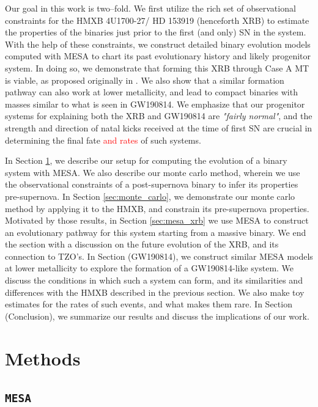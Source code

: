 \documentclass[linenumbers,trackchanges,twocolumn]{aastex701}
\newcommand{\red}{\textcolor{red}}
\begin{document}
Our goal in this work is two--fold. We first utilize the rich set of observational constraints for the HMXB 4U1700-27/ HD 153919 (henceforth XRB) to estimate the properties of the binaries just prior to the first (and only) SN in the system. With the help of these constraints, we construct detailed binary evolution models computed with MESA to chart its past evolutionary history and likely progenitor system. In doing so, we demonstrate that forming this XRB through Case A MT is viable, as proposed originally in \citep{2021A&A...655A..31V}. We also show that a similar formation pathway can also work at lower metallicity, and lead to compact binaries with masses similar to what is seen in GW190814. We emphasize that our progenitor systems for explaining both the XRB and GW190814 are \textit{"fairly normal"}, and the strength and direction of natal kicks received at the time of first SN are crucial in determining the final fate \red{and rates} of such systems.

In Section \ref{sec:methods}, we describe our setup for computing the evolution of a binary system with MESA. We also describe our monte carlo method, wherein we use the observational constraints of a post-supernova binary to infer its properties pre-supernova. In Section \ref{sec:monte_carlo}, we demonstrate our monte carlo method by applying it to the HMXB, and constrain its pre-supernova properties. Motivated by those results, in Section \ref{sec:mesa_xrb} we use MESA to construct an evolutionary pathway for this system starting from a massive binary. We end the section with a discussion on the future evolution of the XRB, and its connection to TZO's. In Section (GW190814), we construct similar MESA models at lower metallicity to explore the formation of a GW190814-like system. We discuss the conditions in which such a system can form, and its similarities and differences with the HMXB described in the previous section. We also make toy estimates for the rates of such events, and what makes them rare. In Section (Conclusion), we summarize our results and discuss the implications of our work.

\section{Methods} \label{sec:methods}

\subsection{\texttt{MESA}}
\end{document}
